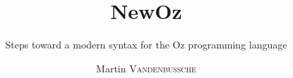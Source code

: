 \documentclass{EPL-master-thesis-covers-EN}
\title{NewOz}
\subtitle{Steps toward a modern syntax for the Oz programming language}
\author{Martin \textsc{Vandenbussche}}
\begin{document}
  \maketitle

  \backcoverpage
\end{document}
